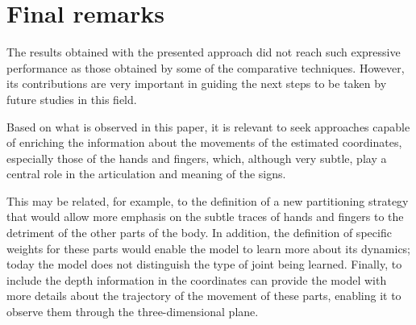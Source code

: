 \section{Final remarks} 
\label{sec:final-remarks}

The results obtained with the presented approach did not reach such expressive performance as those obtained by some of the comparative techniques. However, its contributions are very important in guiding the next steps to be taken by future studies in this field.

Based on what is observed in this paper, it is relevant to seek approaches capable of enriching the information about the movements of the estimated coordinates, especially those of the hands and fingers, which, although very subtle, play a central role in the articulation and meaning of the signs.

This may be related, for example, to the definition of a new partitioning strategy that would allow more emphasis on the subtle traces of hands and fingers to the detriment of the other parts of the body. In addition, the definition of specific weights for these parts would enable the model to learn more about its dynamics; today the model does not distinguish the type of joint being learned. Finally, to include the depth information in the coordinates can provide the model with more details about the trajectory of the movement of these parts, enabling it to observe them through the three-dimensional plane.

